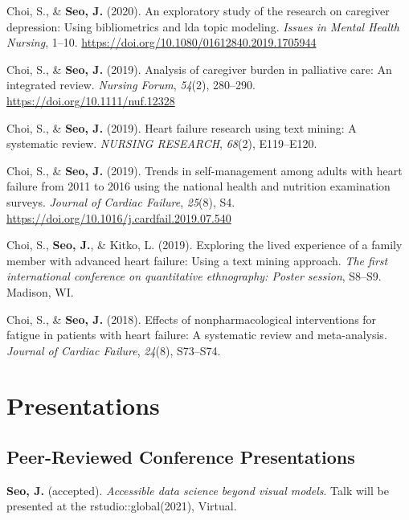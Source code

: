\documentclass[11pt, a4paper]{awesome-cv}
\begin{document}
\hypertarget{refs_healthcare}{}
\leavevmode\hypertarget{ref-doi:10.1080ux2f01612840.2019.1705944}{}%
Choi, S., \& \textbf{Seo, J.} (2020). An exploratory study of the
research on caregiver depression: Using bibliometrics and lda topic
modeling. \emph{Issues in Mental Health Nursing}, 1--10.
\url{https://doi.org/10.1080/01612840.2019.1705944}

\leavevmode\hypertarget{ref-doi:10.1111ux2fnuf.12328}{}%
Choi, S., \& \textbf{Seo, J.} (2019). Analysis of caregiver burden in
palliative care: An integrated review. \emph{Nursing Forum},
\emph{54}(2), 280--290. \url{https://doi.org/10.1111/nuf.12328}

\leavevmode\hypertarget{ref-choi2019heart}{}%
Choi, S., \& \textbf{Seo, J.} (2019). Heart failure research using text
mining: A systematic review. \emph{NURSING RESEARCH}, \emph{68}(2),
E119--E120.

\leavevmode\hypertarget{ref-choi2019trends}{}%
Choi, S., \& \textbf{Seo, J.} (2019). Trends in self-management among
adults with heart failure from 2011 to 2016 using the national health
and nutrition examination surveys. \emph{Journal of Cardiac Failure},
\emph{25}(8), S4. \url{https://doi.org/10.1016/j.cardfail.2019.07.540}

\leavevmode\hypertarget{ref-choi2019exploring}{}%
Choi, S., \textbf{Seo, J.}, \& Kitko, L. (2019). Exploring the lived
experience of a family member with advanced heart failure: Using a text
mining approach. \emph{The first international conference on
quantitative ethnography: Poster session}, S8--S9. Madison, WI.

\leavevmode\hypertarget{ref-choi2018effects}{}%
Choi, S., \& \textbf{Seo, J.} (2018). Effects of nonpharmacological
interventions for fatigue in patients with heart failure: A systematic
review and meta-analysis. \emph{Journal of Cardiac Failure},
\emph{24}(8), S73--S74.

\hypertarget{presentations}{%
\section{Presentations}\label{presentations}}

\hypertarget{peer-reviewed-conference-presentations}{%
\subsection{Peer-Reviewed Conference
Presentations}\label{peer-reviewed-conference-presentations}}

\textbf{Seo, J.} (accepted). \emph{Accessible data science beyond visual
models}. Talk will be presented at the rstudio::global(2021), Virtual.
\end{document}

